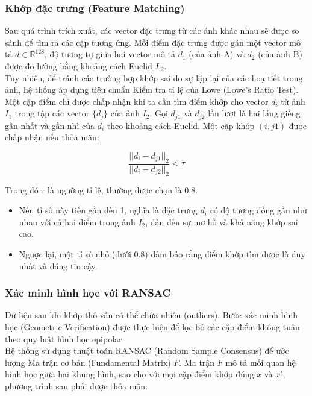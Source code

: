 \subsubsection{Khớp đặc trưng (Feature Matching)}

Sau quá trình trích xuất, các vector đặc trưng từ các ảnh khác nhau sẽ được so sánh để tìm ra các cặp tương ứng. Mỗi điểm đặc trưng được gán một vector mô tả $d \in \mathbb{R}^{128}$, độ tương tự giữa hai vector mô tả $d_1$ (của ảnh A) và $d_2$ (của ảnh B) được đo lường bằng khoảng cách Euclid $L_2$. \\

Tuy nhiên, để tránh các trường hợp khớp sai do sự lặp lại của các hoạ tiết trong ảnh, hệ thống áp dụng tiêu chuẩn Kiểm tra tỉ lệ của Lowe (Lowe's Ratio Test). Một cặp điểm chỉ được chấp nhận khi  ta cần tìm điểm khớp cho vector $d_i$ từ ảnh $I_1$ trong tập các vector $\{d_j\}$ của ảnh $I_2$. Gọi $d_{j1}$ và $d_{j2}$ lần lượt là hai láng giềng gần nhất và gần nhì của $d_i$ theo khoảng cách Euclid. Một cặp khớp $(i, j1)$ được chấp nhận nếu thỏa mãn:

$$\frac{||d_i - d_{j1}||_2}{||d_i - d_{j2}||_2} < \tau$$

Trong đó $\tau$ là ngưỡng tỉ lệ, thường được chọn là $0.8$. 
\begin{itemize}
    \item Nếu tỉ số này tiến gần đến 1, nghĩa là đặc trưng $d_i$ có độ tương đồng gần như nhau với cả hai điểm trong ảnh $I_2$, dẫn đến sự mơ hồ và khả năng khớp sai cao.
    \item Ngược lại, một tỉ số nhỏ (dưới 0.8) đảm bảo rằng điểm khớp tìm được là duy nhất và đáng tin cậy.
\end{itemize} 

\subsubsection{Xác minh hình học với RANSAC}

Dữ liệu sau khi khớp thô vẫn có thể chứa nhiễu (outliers). Bước xác minh hình học (Geometric Verification) được thực hiện để lọc bỏ các cặp điểm không tuân theo quy luật hình học epipolar. \\

Hệ thống sử dụng thuật toán RANSAC (Random Sample Consensus) để ước lượng Ma trận cơ bản (Fundamental Matrix) $F$. Ma trận $F$ mô tả mối quan hệ hình học giữa hai khung hình, sao cho với mọi cặp điểm khớp đúng $x$ và $x'$, phương trình sau phải được thỏa mãn:

